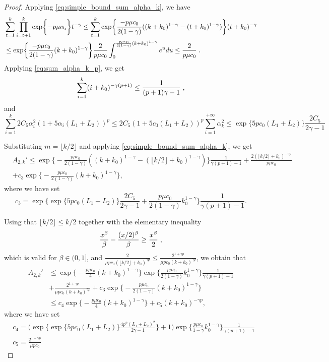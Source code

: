 \begin{proof}
Applying \ref{eq:simple_bound_sum_alpha_k}, we have
\begin{align}
 \begin{aligned}
    &\sum_{t=1}^{k}\prod_{i=t+1}^k\exp\biggl\{-p\mu\alpha_i\biggr\}t^{-\gamma}\leq \sum_{t=1}^k\exp\biggl\{\frac{-p\mu c_0}{2(1-\gamma)}((k+k_0)^{1-\gamma}-(t+k_0)^{1-\gamma})\biggr\}(t+k_0)^{-\gamma}\\&\leq \exp\biggl\{\frac{-p\mu c_0}{2(1-\gamma)}(k+k_0)^{1-\gamma}\biggr\}\frac{2}{p\mu c_0}\int_{0}^{\frac{p\mu c_0}{2(1-\gamma)}(k+k_0)^{1-\gamma}}e^udu \leq \frac{2}{p\mu c_0}\;.
\end{aligned}
\end{align}
Applying \ref{eq:sum_alpha_k_p}, we get
\[
\sum_{i=1}^{k}(i+k_0)^{-\gamma(p+1)} \leq \frac{1}{(p+1)\gamma-1}\;,
\]
and 
\[
\sum_{i=1}^k2C_{5}\alpha_i^2(1+5\alpha_i(L_1+L_2))^{p} \leq 2C_5(1+5c_0(L_1+L_2))^p\sum_{i=1}^{+\infty}\alpha_k^2\leq \exp\biggl\{5pc_0(L_1+L_2)\biggr\}\frac{2C_5}{2\gamma-1}
\]

Substituting $m=\lfloor k/2\rfloor$ and applying \eqref{eq:simple_bound_sum_alpha_k}, we get 
\begin{align}
        &A_{2,k}' \leq \exp\biggl\{-\frac{p\mu c_0}{2(1-\gamma)}((k+k_0)^{1-\gamma}-(\lfloor k/2\rfloor+k_0)^{1-\gamma})\biggr\}\frac{1}{\gamma(p+1)-1} + \frac{2(\lfloor k/2\rfloor +k_0)^{-\gamma p}}{p\mu c_0}\\& + c_3\exp\biggl\{-\frac{p\mu c_0}{2(1-\gamma)}(k+k_0)^{1-\gamma}\biggr\},
\end{align}
where we have set
\begin{equation}
    c_3 = \exp\biggl\{\exp\biggl\{5pc_0(L_1+L_2)\biggr\}\frac{2C_5}{2\gamma-1} +\frac{p\mu c_0}{2(1-\gamma)}k_0^{1-\gamma}\biggr \}\frac{1}{\gamma(p+1)-1}.
\end{equation}

Using that $\lfloor k/2 \rfloor \leq k/2$ together with the elementary inequality 
\[
\frac{x^{\beta}}{\beta} - \frac{(x/2)^{\beta}}{\beta} \geq \frac{x^{\beta}}{2}\;,
\]
which is valid for $\beta \in (0,1]$, and $\frac{2}{\mu pc_0 (\lfloor k/2 \rfloor + k_0)^{\gamma p}} \leq \frac{2^{1+\gamma p}}{\mu pc_0(k+k_0)^{\gamma p}}$, we obtain that 
\begin{align}
        A_{2,k}' &\leq \exp\biggl\{-\frac{p\mu c_0}{4}(k+k_0)^{1-\gamma}\biggr\}\exp\biggl\{\frac{p\mu c_0}{2(1-\gamma)}k_0^{1-\gamma}\biggr\}\frac{1}{\gamma(p+1)-1} \\& + \frac{2^{1+\gamma p}}{\mu pc_0 (k+k_0)^{\gamma p}}+ c_3\exp\biggl\{-\frac{p\mu c_0}{2(1-\gamma)}(k+k_0)^{1-\gamma}\biggr\} \\& \leq c_4\exp\biggl\{-\frac{p\mu c_0}{4}(k+k_0)^{1-\gamma}\biggr\} + c_5(k+k_0)^{-\gamma p},
\end{align} 
where we have set 
\begin{align}
    &c_4 = \biggl(\exp\biggl\{\exp\biggl\{5pc_0(L_1+L_2)\biggr\}\frac{4p^2(L_1+L_2)^2}{2\gamma-1}\biggr\} + 1\biggr)\exp\biggl\{\frac{p\mu c_0}{1-\gamma}k_0^{1-\gamma}\biggr\}\frac{1}{\gamma(p+1)-1} \\&
    c_5 = \frac{2^{1+\gamma p}}{\mu pc_0}
\end{align}


\end{proof}
